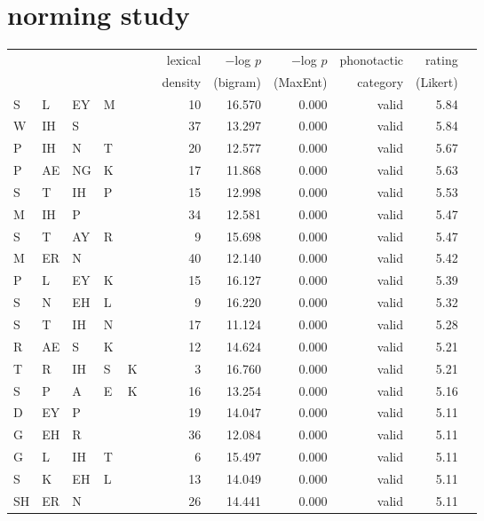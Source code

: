 \section{\citet{Albright2003b} norming study} 

\begin{longtable}{l@{ } l@{ } l@{ } l@{ } l@{ } l r r r r r r} 
\toprule
   &    &    &    &    &   & lexical & $-$log $p$ & $-$log $p$ & phonotactic & rating \\
   &    &    &    &    &   & density & (bigram) & (MaxEnt) & category & (Likert) \\
\midrule
S  & L  & EY & M  &    &   & 10 & 16.570 & 0.000 & valid   & 5.84 \\
W  & IH & S  &    &    &   & 37 & 13.297 & 0.000 & valid   & 5.84 \\
P  & IH & N  & T  &    &   & 20 & 12.577 & 0.000 & valid   & 5.67 \\
P  & AE & NG & K  &    &   & 17 & 11.868 & 0.000 & valid   & 5.63 \\
S  & T  & IH & P  &    &   & 15 & 12.998 & 0.000 & valid   & 5.53 \\
M  & IH & P  &    &    &   & 34 & 12.581 & 0.000 & valid   & 5.47 \\
S  & T  & AY & R  &    &   &  9 & 15.698 & 0.000 & valid   & 5.47 \\
M  & ER & N  &    &    &   & 40 & 12.140 & 0.000 & valid   & 5.42 \\
P  & L  & EY & K  &    &   & 15 & 16.127 & 0.000 & valid   & 5.39 \\
S  & N  & EH & L  &    &   &  9 & 16.220 & 0.000 & valid   & 5.32 \\
S  & T  & IH & N  &    &   & 17 & 11.124 & 0.000 & valid   & 5.28 \\
R  & AE & S  & K  &    &   & 12 & 14.624 & 0.000 & valid   & 5.21 \\
T  & R  & IH & S  & K  &   &  3 & 16.760 & 0.000 & valid   & 5.21 \\
S  & P  & A  & E  & K  &   & 16 & 13.254 & 0.000 & valid   & 5.16 \\
D  & EY & P  &    &    &   & 19 & 14.047 & 0.000 & valid   & 5.11 \\
G  & EH & R  &    &    &   & 36 & 12.084 & 0.000 & valid   & 5.11 \\
G  & L  & IH & T  &    &   &  6 & 15.497 & 0.000 & valid   & 5.11 \\
S  & K  & EH & L  &    &   & 13 & 14.049 & 0.000 & valid   & 5.11 \\
SH & ER & N  &    &    &   & 26 & 14.441 & 0.000 & valid   & 5.11 \\

\end{longtable}
